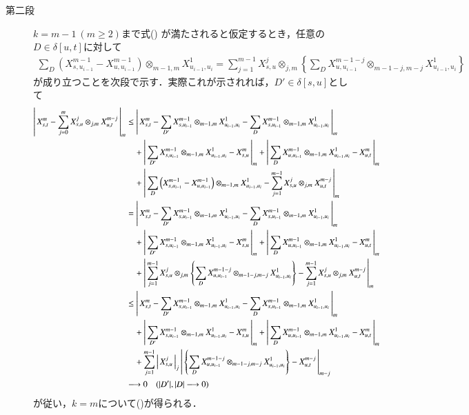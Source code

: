 \begin{prf}
\begin{description}
			\item[第二段]
				$k=m-1\ (m \geq 2)$まで式()
				が満たされると仮定するとき，任意の$D \in \delta[u,t]$に対して
				\begin{align}
					\sum_D \left( X^{m-1}_{s,u_{i-1}} - X^{m-1}_{u,u_{i-1}} \right) \otimes_{m-1,m} X^1_{u_{i-1},u_i}
					= \sum_{j=1}^{m-1} X^j_{s,u} \otimes_{j,m} \left\{ \sum_D X^{m-1-j}_{u,u_{i-1}} \otimes_{m-1-j,m-j} X^1_{u_{i-1},u_i} \right\}
					\label{eq:thm_signature_of_path_multiplicative_2}
				\end{align}
				が成り立つことを次段で示す．実際これが示されれば，$D' \in \delta[s,u]$として
				\begin{align}
					\left|\, X^m_{s,t} - \sum_{j=0}^m X^j_{s,u} \otimes_{j,m} X^{m-j}_{u,t}\, \right|_{m}
					&\leq \left|\, X^m_{s,t} - \sum_{D'} X^{m-1}_{s,u_{i-1}} \otimes_{m-1,m} X^1_{u_{i-1},u_i} 
						- \sum_{D} X^{m-1}_{s,u_{i-1}} \otimes_{m-1,m} X^1_{u_{i-1},u_i}\, \right|_{m} \\
						&\quad+ \left|\, \sum_{D'} X^{m-1}_{s,u_{i-1}} \otimes_{m-1,m} X^1_{u_{i-1},u_i} - X^m_{s,u}\, \right|_{m}
						+ \left|\, \sum_{D} X^{m-1}_{u,u_{i-1}} \otimes_{m-1,m} X^1_{u_{i-1},u_i} - X^m_{u,t}\, \right|_{m} \\
						&\quad+ \left|\, \sum_D \left( X^{m-1}_{s,u_{i-1}} - X^{m-1}_{u,u_{i-1}} \right) \otimes_{m-1,m} X^1_{u_{i-1},u_i} - 
						\sum_{j=1}^{m-1} X^j_{s,u} \otimes_{j,m} X^{m-j}_{u,t}\, \right|_{m} \\
					&= \left|\, X^m_{s,t} - \sum_{D'} X^{m-1}_{s,u_{i-1}} \otimes_{m-1,m} X^1_{u_{i-1},u_i} 
						- \sum_{D} X^{m-1}_{s,u_{i-1}} \otimes_{m-1,m} X^1_{u_{i-1},u_i}\, \right|_{m} \\
						&\quad+ \left|\, \sum_{D'} X^{m-1}_{s,u_{i-1}} \otimes_{m-1,m} X^1_{u_{i-1},u_i} - X^m_{s,u}\, \right|_{m}
						+ \left|\, \sum_{D} X^{m-1}_{u,u_{i-1}} \otimes_{m-1,m} X^1_{u_{i-1},u_i} - X^m_{u,t}\, \right|_{m} \\
						&\quad+ \left|\, \sum_{j=1}^{m-1} X^j_{s,u} \otimes_{j,m} \left\{ \sum_D X^{m-1-j}_{u,u_{i-1}} \otimes_{m-1-j,m-j} X^1_{u_{i-1},u_i} \right\} 
						- \sum_{j=1}^{m-1} X^j_{s,u} \otimes_{j,m} X^{m-j}_{u,t}\, \right|_{m} \\
					&\leq \left|\, X^m_{s,t} - \sum_{D'} X^{m-1}_{s,u_{i-1}} \otimes_{m-1,m} X^1_{u_{i-1},u_i} 
						- \sum_{D} X^{m-1}_{s,u_{i-1}} \otimes_{m-1,m} X^1_{u_{i-1},u_i}\, \right|_{m} \\
						&\quad+ \left|\, \sum_{D'} X^{m-1}_{s,u_{i-1}} \otimes_{m-1,m} X^1_{u_{i-1},u_i} - X^m_{s,u}\, \right|_{m}
						+ \left|\, \sum_{D} X^{m-1}_{u,u_{i-1}} \otimes_{m-1,m} X^1_{u_{i-1},u_i} - X^m_{u,t}\, \right|_{m} \\
						&\quad+  \sum_{j=1}^{m-1} \left|\, X^j_{s,u}\, \right|_{j} 
						\left|\, \left\{ \sum_D X^{m-1-j}_{u,u_{i-1}} \otimes_{m-1-j,m-j} X^1_{u_{i-1},u_i} \right\} - X^{m-j}_{u,t}\, \right|_{m-j} \\
					&\longrightarrow 0 \quad (|D'|,|D| \longrightarrow 0)
				\end{align}
				が従い，$k=m$について()が得られる．
				

\end{description}
\end{prf}
